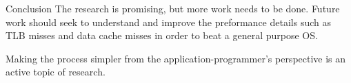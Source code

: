 \begin{block}{Conclusion}
  The research is promising, but more work needs to be done. Future work should seek to understand and improve the preformance details such as TLB misses and data cache misses in order to beat a general purpose OS.

Making the process simpler from the application-programmer's perspective is an active topic of research.

\end{block}
